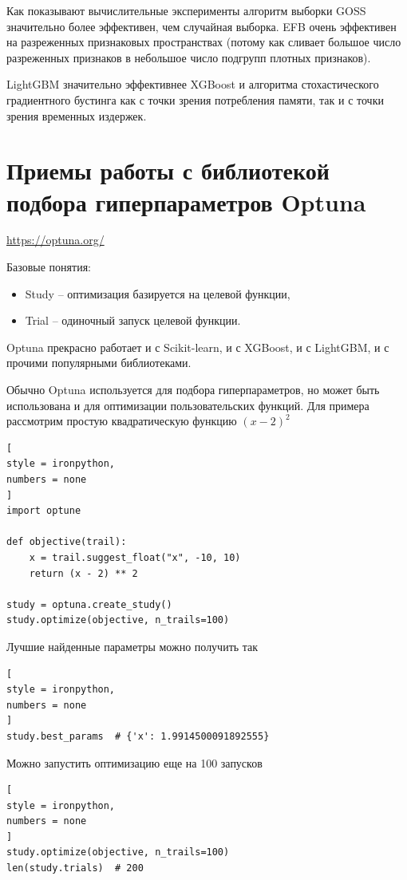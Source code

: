 \documentclass[%
	11pt,
	a4paper,
	utf8,
		]{article}
\begin{document}
Как показывают вычислительные эксперименты алгоритм выборки GOSS значительно более эффективен, чем случайная выборка. EFB очень эффективен на разреженных признаковых пространствах (потому как сливает большое число разреженных признаков в небольшое число подгрупп плотных признаков).

LightGBM значительно эффективнее XGBoost и алгоритма стохастического градиентного бустинга как с точки зрения потребления памяти, так и с точки зрения временных издержек.








\section{Приемы работы с библиотекой подбора гиперпараметров Optuna}

\url{https://optuna.org/}

Базовые понятия:
\begin{itemize}
	\item Study -- оптимизация базируется на целевой функции,
	
	\item Trial -- одиночный запуск целевой функции.
\end{itemize}

Optuna прекрасно работает и с Scikit-learn, и с XGBoost, и с LightGBM, и с прочими популярными библиотеками.

Обычно Optuna используется для подбора гиперпараметров, но может быть использована и для оптимизации пользовательских функций. Для примера рассмотрим простую квадратическую функцию $ (x - 2)^2 $
\begin{lstlisting}[
style = ironpython,
numbers = none
]
import optune

def objective(trail):
    x = trail.suggest_float("x", -10, 10)
    return (x - 2) ** 2

study = optuna.create_study()
study.optimize(objective, n_trails=100)
\end{lstlisting}

Лучшие найденные параметры можно получить так
\begin{lstlisting}[
style = ironpython,
numbers = none	
]
study.best_params  # {'x': 1.9914500091892555}
\end{lstlisting}

Можно запустить оптимизацию еще на 100 запусков
\begin{lstlisting}[
style = ironpython,
numbers = none
]
study.optimize(objective, n_trails=100)
len(study.trials)  # 200
\end{lstlisting}
\end{document}
